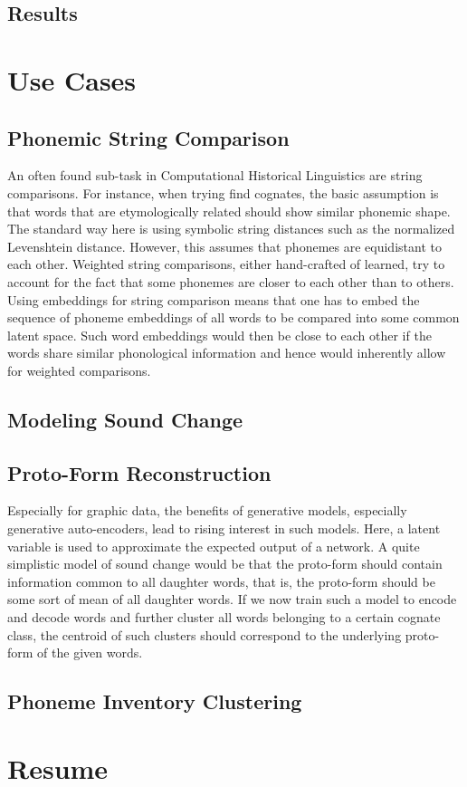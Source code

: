 \documentclass[11pt]{article}
\begin{document}
\subsection{Results}
\section{Use Cases}
\subsection{Phonemic String Comparison}
An often found sub-task in Computational Historical Linguistics are string comparisons. For instance, when trying find cognates, the basic assumption is that words that are etymologically related should show similar phonemic shape. The standard way here is using symbolic string distances such as the normalized Levenshtein distance. However, this assumes that phonemes are equidistant to each other. Weighted string comparisons, either hand-crafted of learned, try to account for the fact that some phonemes are closer to each other than to others. 
Using embeddings for string comparison means that one has to embed the sequence of phoneme embeddings of all words to be compared into some common latent space. Such word embeddings would then be close to each other if the words share similar phonological information and hence would inherently allow for weighted comparisons. 
\subsection{Modeling Sound Change}
\subsection{Proto-Form Reconstruction}
Especially for graphic data, the benefits of generative models, especially generative auto-encoders, lead to rising interest in such models. Here, a latent variable is used to approximate the expected output of a network. A quite simplistic model of sound change would be that the proto-form should contain information common to all daughter words, that is, the proto-form should be some sort of mean of all daughter words. If we now train such a model to encode and decode words and further cluster all words belonging to a certain cognate class, the centroid of such clusters should correspond to the underlying proto-form of the given words.
\subsection{Phoneme Inventory Clustering}
\section{Resume}



 
\end{document}
